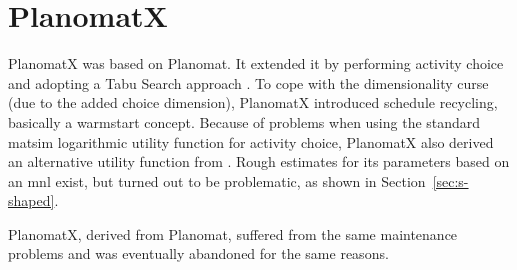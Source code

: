 \section{PlanomatX}
\label{sec:planomatX}
PlanomatX was based on Planomat. It extended it by performing activity choice and adopting a Tabu Search approach \citep[][]{Feil_PhDThesis_2010}. To cope with the dimensionality curse (due to the added choice dimension), PlanomatX introduced schedule recycling, basically a warmstart concept. Because of problems when using the standard \gls{matsim} logarithmic utility function for activity choice, PlanomatX also derived an alternative utility function from \citet[][]{Joh_PhDThesis_2004}. Rough estimates for its parameters based on an \gls{mnl} exist, but turned out to be problematic, as shown in Section~\ref{sec:s-shaped}.

PlanomatX, derived from Planomat, suffered from the same maintenance problems and was eventually abandoned for the same reasons.







